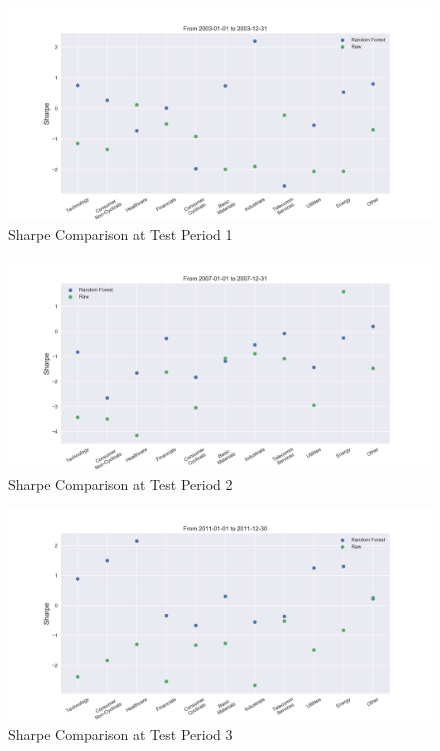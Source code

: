 \documentclass[12pt]{article}
\begin{document}
\begin{figure}[!ht]
  \begin{center}
    \includegraphics[width=1\linewidth]{figure/rf_raw_Sharpe_time_0.png}
  \end{center}
  \caption{Sharpe Comparison at Test Period 1}
  \label{fig:rf_raw_Sharpe_time_1}
\end{figure}

\begin{figure}[!ht]
  \begin{center}
    \includegraphics[width=1\linewidth]{figure/rf_raw_Sharpe_time_1.png}
  \end{center}
  \caption{Sharpe Comparison at Test Period 2}
  \label{fig:rf_raw_Sharpe_time_2}
\end{figure}

\begin{figure}[!ht]
  \begin{center}
    \includegraphics[width=1\linewidth]{figure/rf_raw_Sharpe_time_2.png}
  \end{center}
  \caption{Sharpe Comparison at Test Period 3}
  \label{fig:rf_raw_Sharpe_time_3}
\end{figure}
\end{document}
